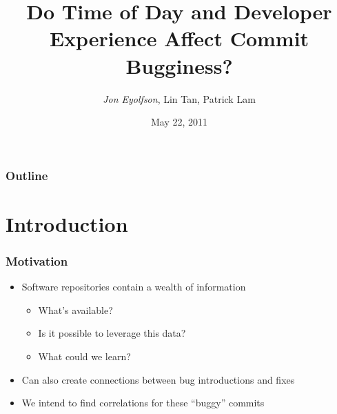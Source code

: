\documentclass[aspectratio=169]{beamer}
\title{Do Time of Day and Developer Experience Affect Commit Bugginess?}
\author{{\em Jon Eyolfson}, Lin Tan, Patrick Lam}
\institute{University of Waterloo}
\date{May 22, 2011}
\begin{document}
\begin{frame}[plain]
\titlepage
\end{frame}

\begin{frame}
  \frametitle{Outline}
  \setcounter{tocdepth}{1}
  \tableofcontents
\end{frame}

\section{Introduction}
\begin{frame}
  \frametitle{Motivation}
  
  \begin{itemize}

    \item Software repositories contain a wealth of information

    \begin{itemize}

      \item What's available?

      \item Is it possible to leverage this data?

      \item What could we learn?

    \end{itemize}

    \item Can also create connections between bug introductions and fixes

    \item We intend to find correlations for these ``buggy'' commits

  \end{itemize}
\end{frame}
\end{document}
